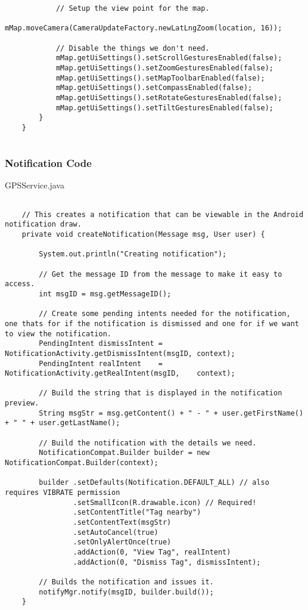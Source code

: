 \begin{lstlisting}
            // Setup the view point for the map.
            mMap.moveCamera(CameraUpdateFactory.newLatLngZoom(location, 16));

            // Disable the things we don't need.
            mMap.getUiSettings().setScrollGesturesEnabled(false);
            mMap.getUiSettings().setZoomGesturesEnabled(false);
            mMap.getUiSettings().setMapToolbarEnabled(false);
            mMap.getUiSettings().setCompassEnabled(false);
            mMap.getUiSettings().setRotateGesturesEnabled(false);
            mMap.getUiSettings().setTiltGesturesEnabled(false);
        }
    }
 
\end{lstlisting}


\subsubsection*{Notification Code}

GPSService.java
\begin{lstlisting}
 
    // This creates a notification that can be viewable in the Android notification draw.
    private void createNotification(Message msg, User user) {

        System.out.println("Creating notification");

        // Get the message ID from the message to make it easy to access.
        int msgID = msg.getMessageID();

        // Create some pending intents needed for the notification, one thats for if the notification is dismissed and one for if we want to view the notification.
        PendingIntent dismissIntent = NotificationActivity.getDismissIntent(msgID, context);
        PendingIntent realIntent    = NotificationActivity.getRealIntent(msgID,    context);

        // Build the string that is displayed in the notification preview.
        String msgStr = msg.getContent() + " - " + user.getFirstName() + " " + user.getLastName();

        // Build the notification with the details we need.
        NotificationCompat.Builder builder = new NotificationCompat.Builder(context);

        builder .setDefaults(Notification.DEFAULT_ALL) // also requires VIBRATE permission
                .setSmallIcon(R.drawable.icon) // Required!
                .setContentTitle("Tag nearby")
                .setContentText(msgStr)
                .setAutoCancel(true)
                .setOnlyAlertOnce(true)
                .addAction(0, "View Tag", realIntent)
                .addAction(0, "Dismiss Tag", dismissIntent);

        // Builds the notification and issues it.
        notifyMgr.notify(msgID, builder.build());
    }
\end{lstlisting}

